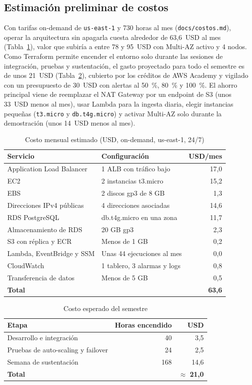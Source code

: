 \documentclass[conference]{IEEEtran}
\begin{document}
\subsection{Estimación preliminar de costos}
Con tarifas on-demand de \texttt{us-east-1} y 730 horas al mes (\texttt{docs/costos.md}), operar la arquitectura sin apagarla cuesta alrededor de 63,6~USD al mes (Tabla~\ref{tab:cost}), valor que subiría a entre 78 y 95~USD con Multi-AZ activo y 4 nodos. Como Terraform permite encender el entorno solo durante las sesiones de integración, pruebas y sustentación, el gasto proyectado para todo el semestre es de unos 21~USD (Tabla~\ref{tab:sem}), cubierto por los créditos de AWS Academy y vigilado con un presupuesto de 30~USD con alertas al 50~\%, 80~\% y 100~\%. El ahorro principal viene de reemplazar el NAT Gateway por un endpoint de S3 (unos 33~USD menos al mes), usar Lambda para la ingesta diaria, elegir instancias pequeñas (\texttt{t3.micro} y \texttt{db.t4g.micro}) y activar Multi-AZ solo durante la demostración (unos 14~USD menos al mes).

\begin{table}[t]
\caption{Costo mensual estimado (USD, on-demand, us-east-1, 24/7)}
\label{tab:cost}
\centering
\footnotesize
\begin{tabular}{@{}p{2.6cm}p{3.5cm}r@{}}
\toprule
Servicio & Configuración & USD/mes \\
\midrule
Application Load Balancer & 1 ALB con tráfico bajo & 17,0 \\
EC2 & 2 instancias t3.micro & 15,2 \\
EBS & 2 discos gp3 de 8 GB & 1,3 \\
Direcciones IPv4 públicas & 4 direcciones asociadas & 14,6 \\
RDS PostgreSQL & db.t4g.micro en una zona & 11,7 \\
Almacenamiento de RDS & 20 GB gp3 & 2,3 \\
S3 con réplica y ECR & Menos de 1 GB & 0,2 \\
Lambda, EventBridge y SSM & Unas 44 ejecuciones al mes & 0,0 \\
CloudWatch & 1 tablero, 3 alarmas y logs & 0,8 \\
Transferencia de datos & Menos de 5 GB & 0,5 \\
\midrule
\textbf{Total} & & \textbf{63,6} \\
\bottomrule
\end{tabular}
\end{table}

\begin{table}[t]
\caption{Costo esperado del semestre}
\label{tab:sem}
\centering
\footnotesize
\begin{tabular}{@{}lrr@{}}
\toprule
Etapa & Horas encendido & USD \\
\midrule
Desarrollo e integración & 40 & 3,5 \\
Pruebas de auto-scaling y failover & 24 & 2,5 \\
Semana de sustentación & 168 & 14,6 \\
\midrule
\textbf{Total} & & $\approx$ \textbf{21,0} \\
\bottomrule
\end{tabular}
\end{table}
\end{document}
